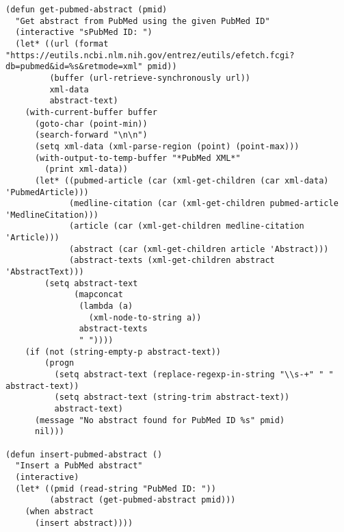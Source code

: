 \documentclass{article}
\begin{document}
\begin{itemize}
\begin{itemize}
\begin{itemize}
\begin{itemize}
\begin{verbatim}
(defun get-pubmed-abstract (pmid)
  "Get abstract from PubMed using the given PubMed ID"
  (interactive "sPubMed ID: ")
  (let* ((url (format "https://eutils.ncbi.nlm.nih.gov/entrez/eutils/efetch.fcgi?db=pubmed&id=%s&retmode=xml" pmid))
         (buffer (url-retrieve-synchronously url))
         xml-data
         abstract-text)
    (with-current-buffer buffer
      (goto-char (point-min))
      (search-forward "\n\n")
      (setq xml-data (xml-parse-region (point) (point-max)))
      (with-output-to-temp-buffer "*PubMed XML*"
        (print xml-data))
      (let* ((pubmed-article (car (xml-get-children (car xml-data) 'PubmedArticle)))
             (medline-citation (car (xml-get-children pubmed-article 'MedlineCitation)))
             (article (car (xml-get-children medline-citation 'Article)))
             (abstract (car (xml-get-children article 'Abstract)))
             (abstract-texts (xml-get-children abstract 'AbstractText)))
        (setq abstract-text
              (mapconcat 
               (lambda (a) 
                 (xml-node-to-string a))
               abstract-texts
               " "))))
    (if (not (string-empty-p abstract-text))
        (progn
          (setq abstract-text (replace-regexp-in-string "\\s-+" " " abstract-text))
          (setq abstract-text (string-trim abstract-text))
          abstract-text)
      (message "No abstract found for PubMed ID %s" pmid)
      nil)))

(defun insert-pubmed-abstract ()
  "Insert a PubMed abstract"
  (interactive)
  (let* ((pmid (read-string "PubMed ID: "))
         (abstract (get-pubmed-abstract pmid)))
    (when abstract
      (insert abstract))))
\end{verbatim}


\end{itemize}
\end{itemize}
\end{itemize}
\end{itemize}
\end{document}
